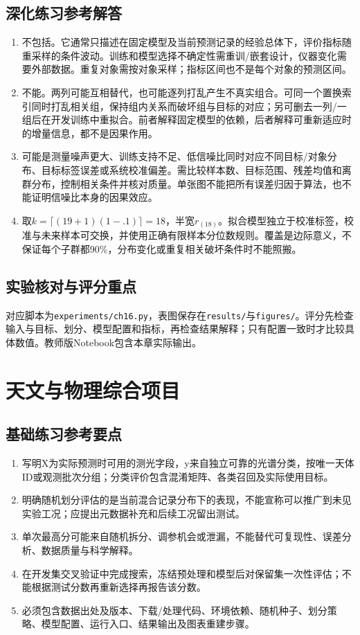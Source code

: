 \section*{深化练习参考解答}
\begin{enumerate}[label=D\arabic*.]
\item 不包括。它通常只描述在固定模型及当前预测记录的经验总体下，评价指标随重采样的条件波动。训练和模型选择不确定性需重训/嵌套设计，仪器变化需要外部数据。重复对象需按对象采样；指标区间也不是每个对象的预测区间。
\item 不能。两列可能互相替代，也可能逐列打乱产生不真实组合。可同一个置换索引同时打乱相关组，保持组内关系而破坏组与目标的对应；另可删去一列/一组后在开发训练中重拟合。前者解释固定模型的依赖，后者解释可重新适应时的增量信息，都不是因果作用。
\item 可能是测量噪声更大、训练支持不足、低信噪比同时对应不同目标/对象分布、目标标签误差或系统校准偏差。需比较样本数、目标范围、残差均值和离群分布，控制相关条件并核对质量。单张图不能把所有误差归因于算法，也不能证明信噪比本身的因果效应。
\item 取$k=\lceil(19+1)(1-.1)\rceil=18$，半宽$r_{(18)}$。拟合模型独立于校准标签，校准与未来样本可交换，并使用正确有限样本分位数规则。覆盖是边际意义，不保证每个子群都90\%，分布变化或重复相关破坏条件时不能照搬。
\end{enumerate}

\section*{实验核对与评分重点}
对应脚本为\texttt{experiments/ch16.py}，表图保存在\texttt{results/}与\texttt{figures/}。评分先检查输入与目标、划分、模型配置和指标，再检查结果解释；只有配置一致时才比较具体数值。教师版Notebook包含本章实际输出。

\chapter{天文与物理综合项目}
\section*{基础练习参考要点}
\begin{enumerate}[label=\arabic*.]
\item 写明X为实际预测时可用的测光字段，y来自独立可靠的光谱分类，按唯一天体ID或观测批次分组；分类评价包含混淆矩阵、各类召回及实际使用目标。
\item 明确随机划分评估的是当前混合记录分布下的表现，不能宣称可以推广到未见实验工况；应提出元数据补充和后续工况留出测试。
\item 单次最高分可能来自随机拆分、调参机会或泄漏，不能替代可复现性、误差分析、数据质量与科学解释。
\item 在开发集交叉验证中完成搜索，冻结预处理和模型后对保留集一次性评估；不能根据测试分数再重新选择再报告该分数。
\item 必须包含数据出处及版本、下载/处理代码、环境依赖、随机种子、划分策略、模型配置、运行入口、结果输出及图表重建步骤。
\end{enumerate}
